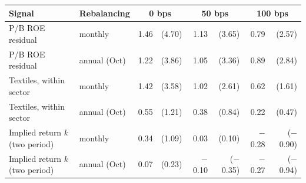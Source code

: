 \begin{tabular}{llrrrrrr}
\toprule
Signal & Rebalancing & \multicolumn{2}{c}{0 bps} & \multicolumn{2}{c}{50 bps} & \multicolumn{2}{c}{100 bps} \\
\midrule
P/B ROE residual & monthly & 1.46 & (4.70) & 1.13 & (3.65) & 0.79 & (2.57) \\
P/B ROE residual & annual (Oct) & 1.22 & (3.86) & 1.05 & (3.36) & 0.89 & (2.84) \\
Textiles, within sector & monthly & 1.42 & (3.58) & 1.02 & (2.61) & 0.62 & (1.61) \\
Textiles, within sector & annual (Oct) & 0.55 & (1.21) & 0.38 & (0.84) & 0.22 & (0.47) \\
Implied return $k$ (two period) & monthly & 0.34 & (1.09) & 0.03 & (0.10) & \ensuremath{-}0.28 & (\ensuremath{-}0.90) \\
Implied return $k$ (two period) & annual (Oct) & 0.07 & (0.23) & \ensuremath{-}0.10 & (\ensuremath{-}0.35) & \ensuremath{-}0.27 & (\ensuremath{-}0.94) \\
\bottomrule
\end{tabular}
